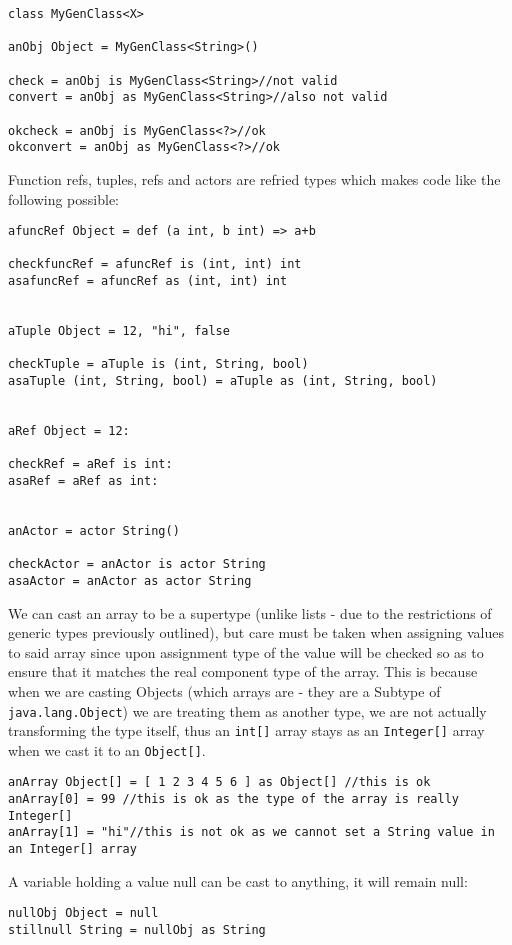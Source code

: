 \documentclass[conc-doc]{subfiles}
\begin{document}
\begin{lstlisting}
class MyGenClass<X>

anObj Object = MyGenClass<String>()

check = anObj is MyGenClass<String>//not valid
convert = anObj as MyGenClass<String>//also not valid

okcheck = anObj is MyGenClass<?>//ok
okconvert = anObj as MyGenClass<?>//ok
\end{lstlisting}

Function refs, tuples, refs and actors are refried types which makes code like the following possible:
\begin{lstlisting}
afuncRef Object = def (a int, b int) => a+b

checkfuncRef = afuncRef is (int, int) int
asafuncRef = afuncRef as (int, int) int


aTuple Object = 12, "hi", false

checkTuple = aTuple is (int, String, bool)
asaTuple (int, String, bool) = aTuple as (int, String, bool)


aRef Object = 12:

checkRef = aRef is int:
asaRef = aRef as int:


anActor = actor String()

checkActor = anActor is actor String
asaActor = anActor as actor String
\end{lstlisting}

We can cast an array to be a supertype (unlike lists - due to the restrictions of generic types previously outlined), but care must be taken when assigning values to said array since upon assignment type of the value will be checked so as to ensure that it matches the real component type of the array. This is because when we are casting Objects (which arrays are - they are a Subtype of \lstinline{java.lang.Object}) we are treating them as another type, we are not actually transforming the type itself, thus an \lstinline{int[]} array stays as an \lstinline{Integer[]} array when we cast it to an \lstinline{Object[]}.

\begin{lstlisting}
anArray Object[] = [ 1 2 3 4 5 6 ] as Object[] //this is ok
anArray[0] = 99 //this is ok as the type of the array is really Integer[]
anArray[1] = "hi"//this is not ok as we cannot set a String value in an Integer[] array
\end{lstlisting}

A variable holding a value null can be cast to anything, it will remain null:
\begin{lstlisting}
nullObj Object = null
stillnull String = nullObj as String
\end{lstlisting}
\end{document}
